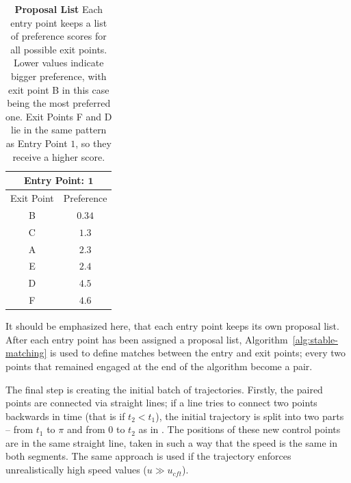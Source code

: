 \begin{table}[b]
	\centering
	\caption{
	\textbf{Proposal List} Each entry point keeps a list of preference scores for all possible exit points.
	Lower values indicate bigger preference, with exit point B in this case being the most preferred one.
	Exit Points F and D lie in the same pattern as Entry Point $1$, so they receive a higher score.
	}
	\begin{tabular}{|c|c|}
		\hline
		\multicolumn{2}{|c|}{\textbf{Entry Point: } $\mathbf{1}$}	\\
 		\hline
 		\hline
		Exit Point	&	Preference\\
		\hline
		\rowcolor[gray]{0.9}B	&	$\mathbf{0.34}$	\\
		C	&	$1.3$			\\
		A	&	$2.3$			\\
		E	&	$2.4$			\\
		D	&	$4.5$			\\
		F	&	$4.6$			\\
		\hline
		\end{tabular}
	\label{tab:proposal-list}
\end{table}

It should be emphasized here, that each entry point keeps its own proposal list.
After each entry point has been assigned a proposal list, Algorithm~\ref{alg:stable-matching} is used to define matches between the entry and exit points;
every two points that remained engaged at the end of the algorithm become a pair.

The final step is creating the initial batch of trajectories.
Firstly, the paired points are connected via straight lines;
if a line tries to connect two points backwards in time (that is if $t_2 < t_1$), the initial trajectory is split into two parts -- from $t_1$ to $\pi$ and from $0$ to $t_2$ as in \cite{Yersin:2009}.
The positions of these new control points are in the same straight line, taken in such a way that the speed is the same in both segments.
The same approach is used if the trajectory enforces unrealistically high speed values ($u \gg u_{cft}$).

